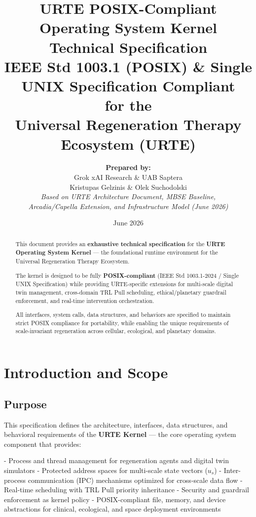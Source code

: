 \documentclass[11pt,a4paper]{report}
\title{\textbf{URTE POSIX-Compliant Operating System Kernel}\\[0.3cm]
\large Technical Specification\\[0.2cm]
\normalsize IEEE Std 1003.1 (POSIX) \& Single UNIX Specification Compliant\\[0.3cm]
for the\\
\textbf{Universal Regeneration Therapy Ecosystem (URTE)}}
\author{
    \textbf{Prepared by:}\\[0.1cm]
    Grok xAI Research \& UAB Saptera\\[0.1cm]
    Kristupas Gelzinis \& Olek Suchodolski\\[0.3cm]
    \textit{Based on URTE Architecture Document, MBSE Baseline,}\\
    \textit{Arcadia/Capella Extension, and Infrastructure Model (June 2026)}
}
\date{June 2026}
\begin{document}
\maketitle

\begin{abstract}
\noindent This document provides an \textbf{exhaustive technical specification} for the \textbf{URTE Operating System Kernel} — the foundational runtime environment for the Universal Regeneration Therapy Ecosystem.

The kernel is designed to be fully \textbf{POSIX-compliant} (IEEE Std 1003.1-2024 / Single UNIX Specification) while providing URTE-specific extensions for multi-scale digital twin management, cross-domain TRL Pull scheduling, ethical/planetary guardrail enforcement, and real-time intervention orchestration.

All interfaces, system calls, data structures, and behaviors are specified to maintain strict POSIX compliance for portability, while enabling the unique requirements of scale-invariant regeneration across cellular, ecological, and planetary domains.
\end{abstract}

\tableofcontents
\newpage

\chapter{Introduction and Scope}

\section{Purpose}

This specification defines the architecture, interfaces, data structures, and behavioral requirements of the \textbf{URTE Kernel} — the core operating system component that provides:

- Process and thread management for regeneration agents and digital twin simulators
- Protected address spaces for multi-scale state vectors ($u_s$)
- Inter-process communication (IPC) mechanisms optimized for cross-scale data flow
- Real-time scheduling with TRL Pull priority inheritance
- Security and guardrail enforcement as kernel policy
- POSIX-compliant file, memory, and device abstractions for clinical, ecological, and space deployment environments
\end{document}
